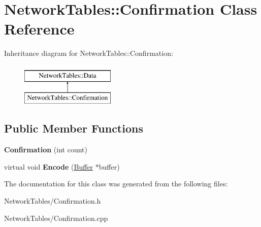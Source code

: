 \hypertarget{classNetworkTables_1_1Confirmation}{
\section{NetworkTables::Confirmation Class Reference}
\label{classNetworkTables_1_1Confirmation}
}
Inheritance diagram for NetworkTables::Confirmation:\begin{figure}[H]
\begin{center}
\leavevmode
\includegraphics[height=2.000000cm]{classNetworkTables_1_1Confirmation}
\end{center}
\end{figure}
\subsection*{Public Member Functions}
\begin{DoxyCompactItemize}
\item 
\hypertarget{classNetworkTables_1_1Confirmation_a55a30fe42345383cbd10aaba58ead627}{
{\bfseries Confirmation} (int count)}
\label{classNetworkTables_1_1Confirmation_a55a30fe42345383cbd10aaba58ead627}

\item 
\hypertarget{classNetworkTables_1_1Confirmation_af229b02ead58b04fea918bbc0e2e0ba9}{
virtual void {\bfseries Encode} (\hyperlink{classNetworkTables_1_1Buffer}{Buffer} $\ast$buffer)}
\label{classNetworkTables_1_1Confirmation_af229b02ead58b04fea918bbc0e2e0ba9}

\end{DoxyCompactItemize}


The documentation for this class was generated from the following files:\begin{DoxyCompactItemize}
\item 
NetworkTables/Confirmation.h\item 
NetworkTables/Confirmation.cpp\end{DoxyCompactItemize}
